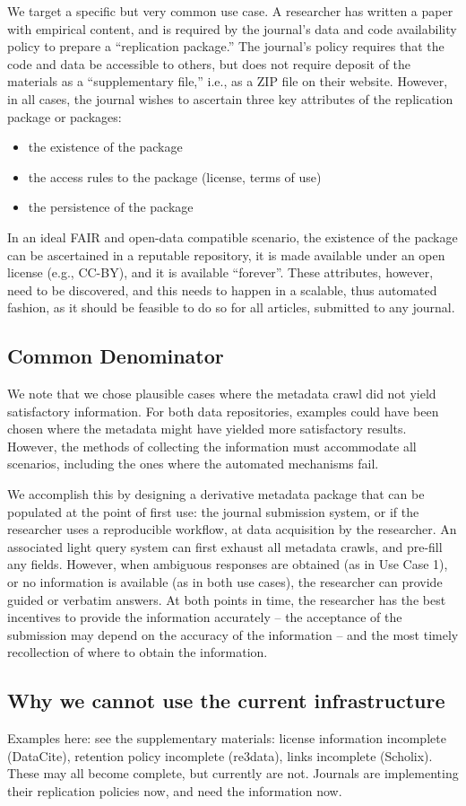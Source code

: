 We target a specific but very common use case. A researcher has written a paper with empirical content, and is required by the journal's data and code availability policy to prepare a ``replication package.'' The journal's policy requires that the code and data be accessible to others, but does not require deposit of the materials as a ``supplementary file,'' i.e., as a ZIP file on their website. However, in all cases, the journal wishes to ascertain three key attributes of the replication package or packages:
\begin{itemize}
    \item the existence of the package
    \item the access rules to the package (license, terms of use)
    \item the persistence of the package
\end{itemize}
In an ideal \ac{FAIR} and open-data compatible scenario, the existence of the package can be ascertained in a reputable repository, it is made available under an open license (e.g., CC-BY), and it is available ``forever''. These attributes, however, need to be discovered, and this needs to happen in a scalable, thus automated fashion, as it should be feasible to do so for all articles, submitted to any journal. 






\subsection{Common Denominator}
We note that we chose plausible cases where the metadata crawl did not yield satisfactory information. For both data repositories, examples could have been chosen where the metadata might have yielded more satisfactory results. However, the methods of collecting the information must accommodate all scenarios, including the ones where the automated mechanisms fail.

We accomplish this by designing a derivative metadata package that can be populated at the point of first use: the journal submission system, or if the researcher uses a reproducible workflow, at data acquisition by the researcher. An associated light query system can first exhaust all metadata crawls, and pre-fill any fields. However, when ambiguous responses are obtained (as in Use Case 1), or no information is available (as in both use cases), the researcher can provide guided or verbatim answers. At both points in time, the researcher has the best incentives to provide the information accurately -- the acceptance of the submission may depend on the accuracy of the information -- and the most timely recollection of where to obtain the information.


\subsection{Why we cannot use the current infrastructure}
Examples here: see the supplementary materials: license information incomplete (DataCite), retention policy incomplete (re3data), links incomplete (Scholix). These may all become complete, but currently are not. Journals are implementing their replication policies now, and need the information now.